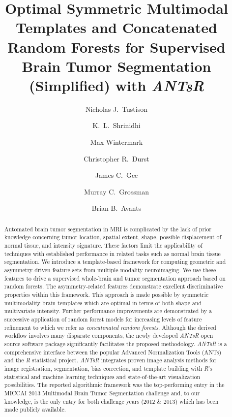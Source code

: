 \documentclass[preprint,authoryear,review,12pt]{elsarticle}
\begin{document}
\begin{frontmatter}

\title{Optimal Symmetric Multimodal Templates and Concatenated Random Forests for Supervised Brain Tumor Segmentation (Simplified) with \textit{ANTsR}}

\author[label1]{Nicholas J.~Tustison
  }
\author[label2]{K.~L.~Shrinidhi}
\author[label1]{Max Wintermark}
\author[label1]{Christopher R.~Durst}
\author[label1]{James C.~Gee}
\author[label3]{Murray C.~Grossman}
\author[label2]{Brian B.~Avants}
\address[label1]{Department of Radiology and Medical Imaging, University of Virginia, Charlottesville, VA}
\address[label2]{Penn Image Computing and Science Laboratory, 
                 Department of Radiology, University of Pennsylvania,
                Philadelphia, PA}
\address[label3]{Department of Neurology, University of Pennsylvania,
                Philadelphia, PA}



\begin{abstract} 
Automated brain tumor segmentation in MRI is complicated by the lack
of prior knowledge concerning tumor location, spatial extent, shape,
possible displacement of normal tissue, and intensity signature.
These factors limit the applicability of techniques with established
performance in related tasks such as normal brain tissue segmentation.
We introduce a template-based framework for computing geometric and
asymmetry-driven feature sets from multiple modality neuroimaging.  We
use these features to drive a supervised whole-brain and tumor segmentation
approach based on random forests.  The asymmetry-related features 
demonstrate excellent discriminative properties within this framework. 
This approach is made possible by symmetric multimodality brain templates which are optimal
in terms of both shape and multivariate intensity.  Further
performance improvements are demonstrated by a successive application
of random forest models for increasing levels of feature refinement to
which we refer as {\it concatenated random forests}.  Although the
derived workflow involves many disparate components, the newly
developed \textit{ANTsR} open source software package significantly facilitates
the proposed methodology.  \textit{ANTsR} is a comprehensive interface between the
popular Advanced Normalization Tools (ANTs) and the \textit{R}
statistical project. \textit{ANTsR} integrates proven image analysis methods
for image registration, segmentation, bias correction, and
template building with \textit{R}'s statistical and machine
learning techniques and state-of-the-art visualization possibilities.  
The reported algorithmic framework was the
top-performing entry in the MICCAI 2013 Multimodal Brain Tumor
Segmentation challenge and, to our knowledge, is the only entry for
both challenge years (2012 \& 2013) which has been made publicly
available.
\end{abstract}


\end{frontmatter}
\end{document}
